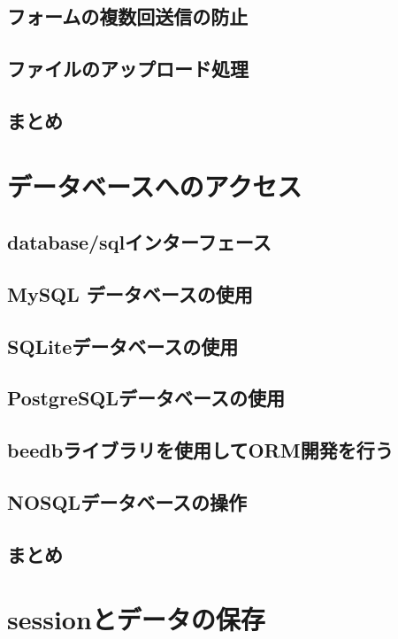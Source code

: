 \subsection{フォームの複数回送信の防止}

\subsection{ファイルのアップロード処理}

\subsection{まとめ}


\section{データベースへのアクセス}

\subsection{database/sqlインターフェース}

\subsection{MySQL データベースの使用}

\subsection{SQLiteデータベースの使用}

\subsection{PostgreSQLデータベースの使用}

\subsection{beedbライブラリを使用してORM開発を行う}

\subsection{NOSQLデータベースの操作}

\subsection{まとめ}



\section{sessionとデータの保存}

